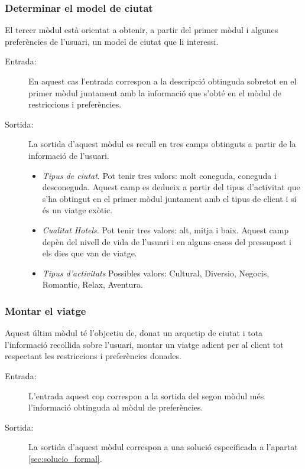 \documentclass[11pt,a4paper]{article}
\begin{document}
\subsubsection{Determinar el model de ciutat}

El tercer mòdul està orientat a obtenir, a partir del primer mòdul i algunes preferències de l'usuari, un model de ciutat que li interessi.

\begin{description}
	\item[Entrada:] En aquest cas l'entrada correspon a la descripció obtinguda sobretot en el primer mòdul juntament amb la informació que s'obté en el mòdul de restriccions i preferències. 

	\item[Sortida:] La sortida d'aquest mòdul es recull en tres camps obtinguts a partir de la informació de l'usuari. 
	\begin{itemize}
	\item \emph{Tipus de ciutat}. Pot tenir tres valors: molt coneguda, coneguda i desconeguda.
	Aquest camp es dedueix a partir del tipus d'activitat que s'ha obtingut en el primer mòdul juntament amb el tipus de client i si és un viatge exòtic.
	\item \emph{Cualitat Hotels}. Pot tenir tres valors: alt, mitja i baix.
	Aquest camp depèn del nivell de vida de l'usuari i en alguns casos del pressupost i els dies que van de viatge.
	\item \emph{Tipus d'activitats} Possibles valors: Cultural, Diversio, Negocis, Romantic, Relax, Aventura.
	
	\end{itemize}

\end{description}


\subsubsection{Montar el viatge}

Aquest últim mòdul té l'objectiu de, donat un arquetip de ciutat i tota l'informació recollida sobre l'usuari, montar un viatge adient per al client tot respectant les restriccions i preferències donades.


\begin{description}
	\item[Entrada:] L'entrada aquest cop correspon a la sortida del segon mòdul més l'informació obtinguda al mòdul de preferències.

	\item[Sortida:] La sortida d'aquest mòdul correspon a una solució especificada a l'apartat \ref{sec:solucio_formal}.	
\end{description}
\end{document}
